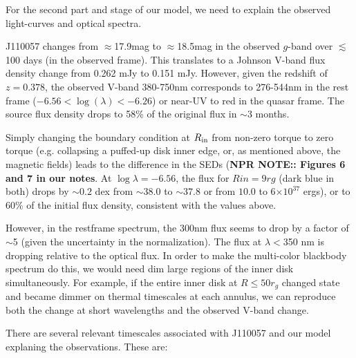 \documentclass[11pt,a4paper]{article}
\begin{document}
\citet{Gardner_Done2017}
\citet{Jiang_Stone_Davis2016}

For the second part and stage of our model, we need to explain the 
observed light-curves and optical spectra. 

J110057 changes from $\approx$17.9mag to $\approx$18.5mag in the observed $g$-band over $\lesssim$100 days 
(in the observed frame).  This translates to a Johnson V-band flux density change from 0.262 mJy to 0.151 mJy. 
However, given the redshift of $z=0.378$, the observed V-band 380-750nm corresponds to 276-544nm in the rest frame 
($-6.56 < \log (\lambda) < -6.26$) or near-UV to red in the quasar frame. The source flux density drops to 58\% of the 
original flux in $\sim$3 months. %

Simply changing the boundary condition at $R_{\rm in}$ from non-zero torque to zero torque (e.g. collapsing a puffed-up disk inner edge, or, as mentioned above, the magnetic fields) leads to the difference in the SEDs ({\bf NPR NOTE:: Figures 6 and 7 in our notes}. 
At $\log \lambda = −6.56$, the flux for $Rin = 9rg$ (dark blue in
both) drops by $\sim0.2$ dex from $\sim38.0$ to $\sim37.8 $ or from $10.0$ to
6$\times 10^{37}$ ergs), or to 60\% of the initial flux density, consistent
with the values above.  

However, in the restframe spectrum, the 300nm flux seems to drop by a
factor of $\sim$5 (given the uncertainty in the normalization). The flux at 
$\lambda < $350 nm is dropping relative to the optical flux. In order to make the multi-color blackbody spectrum do
this, we would need dim large regions of the inner disk simultaneously.  
For example, if the entire inner disk at $R \leq 50 r_{g}$ changed state and became dimmer on thermal timescales at each annulus,
we can reproduce both the change at short wavelengths and the observed V-band
change. 


There are several relevant timescales associated with J110057 and our 
model explaning the observations. These are: 
\end{document}

